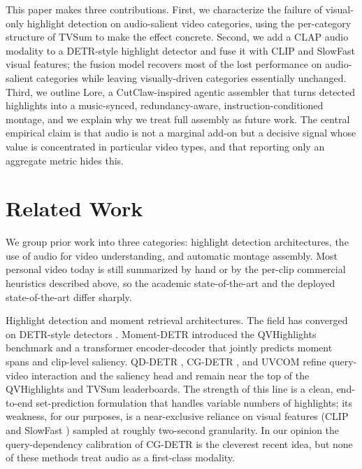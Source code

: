 \documentclass[10pt,twocolumn,letterpaper]{article}
\begin{document}
This paper makes three contributions. First, we characterize the failure of visual-only highlight detection on audio-salient video categories, using the per-category structure of TVSum to make the effect concrete. Second, we add a CLAP audio modality \cite{clap,laionclap} to a DETR-style highlight detector and fuse it with CLIP and SlowFast visual features; the fusion model recovers most of the lost performance on audio-salient categories while leaving visually-driven categories essentially unchanged. Third, we outline Lore, a CutClaw-inspired agentic assembler \cite{cutclaw} that turns detected highlights into a music-synced, redundancy-aware, instruction-conditioned montage, and we explain why we treat full assembly as future work. The central empirical claim is that audio is not a marginal add-on but a decisive signal whose value is concentrated in particular video types, and that reporting only an aggregate metric hides this.

\section{Related Work}

We group prior work into three categories: highlight detection architectures, the use of audio for video understanding, and automatic montage assembly. Most personal video today is still summarized by hand or by the per-clip commercial heuristics described above, so the academic state-of-the-art and the deployed state-of-the-art differ sharply.

Highlight detection and moment retrieval architectures. The field has converged on DETR-style detectors \cite{detr}. Moment-DETR \cite{momentdetr} introduced the QVHighlights benchmark and a transformer encoder-decoder that jointly predicts moment spans and clip-level saliency. QD-DETR \cite{qddetr}, CG-DETR \cite{cgdetr}, and UVCOM \cite{uvcom} refine query-video interaction and the saliency head and remain near the top of the QVHighlights and TVSum leaderboards. The strength of this line is a clean, end-to-end set-prediction formulation that handles variable numbers of highlights; its weakness, for our purposes, is a near-exclusive reliance on visual features (CLIP \cite{clip} and SlowFast \cite{slowfast}) sampled at roughly two-second granularity. In our opinion the query-dependency calibration of CG-DETR is the cleverest recent idea, but none of these methods treat audio as a first-class modality.
\end{document}
